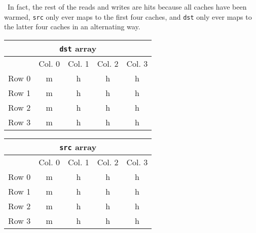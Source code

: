 \documentclass[12pt]{article}
\newenvironment{sol}[1][Solution]{\begin{trivlist}
		\item[\hskip \labelsep {\bfseries #1:}]}{\end{trivlist}}
\begin{document}
\begin{sol}
	\
	In fact, the rest of the reads and writes are hits because all caches have been warmed, \texttt{src} only
	ever maps to the first four caches, and \texttt{dst} only ever maps to the latter four caches in an
	alternating way.
	\begin{center}
		\begin{tabular}{ccccc}
			\multicolumn{5}{c}{\texttt{dst} array} \\
			\hline
			{} & Col. 0 & Col. 1 & {} Col. 2 & {} Col. 3\\
			\hline
			Row 0 & m & h & h & h\\
			Row 1 & m & h & h & h\\
			Row 2 & m & h & h & h\\
			Row 3 & m & h & h & h\\
		\end{tabular}
	\end{center}
	\begin{center}
		\begin{tabular}{ccccc}
			\multicolumn{5}{c}{\texttt{src} array} \\
			\hline
			{} & Col. 0 & Col. 1 & {} Col. 2 & {} Col. 3\\
			\hline
			Row 0 & m & h & h & h\\
			Row 1 & m & h & h & h\\
			Row 2 & m & h & h & h\\
			Row 3 & m & h & h & h\\
		\end{tabular}
	\end{center}
\end{sol}
\end{document}
